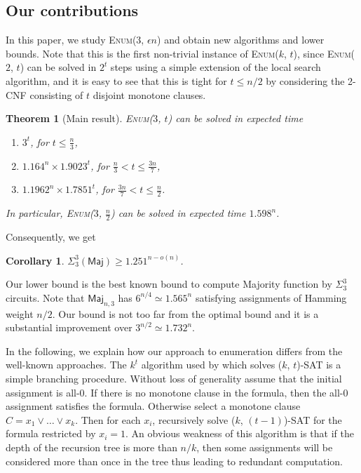 \documentclass[10pt,a4paper]{article}
\newtheorem{theorem}{Theorem}
\newtheorem{corollary}{Corollary}
\newcommand{\Maj}{\mathsf{Maj}}
\newcommand\enumballsat[2]{\textsc{Enum($#1$, $#2$)}}
\newcommand\ballsat[2]{\textsc{($#1$, $#2$)-SAT}}
\begin{document}
\subsection{Our contributions}

In this paper, we study \enumballsat{3}{\epsilon n} 
and obtain new algorithms and lower bounds. Note that this is the first non-trivial instance of \enumballsat{k}{t}, since \enumballsat{2}{t} can be solved in $2^t$ steps using a simple extension of the local search algorithm, and it is easy to see that this is tight for $t \le n/2$ by considering the 2-CNF consisting of $t$ disjoint monotone clauses.


\begin{theorem}[Main result]
\label{thm:main-result}
\enumballsat{3}{t} can be solved in expected time

\begin{enumerate}
	\item $3^t$, for $t \le \frac{n}{3}$,
	\item $1.164^n \times 1.9023^t$, for $\frac{n}{3} < t \le \frac{3n}{7}$,
	\item $1.1962^n \times 1.7851^t$, for $\frac{3n}{7} < t \le \frac{n}{2}$.
\end{enumerate}

In particular, \enumballsat{3}{\frac{n}{2}} can be solved in expected time $1.598^n$. 
\end{theorem}


Consequently, we get
\begin{corollary}
$\Sigma^3_3(\Maj) \ge 1.251^{n - o(n)}$.
\end{corollary}

Our lower bound is the best known bound
to compute Majority function by $\Sigma^3_3$ circuits.
Note that $\Maj_{n, 3}$ has $6^{n/4} \simeq 1.565^n$ satisfying assignments of Hamming weight $n/2$. Our bound is not too far from the optimal bound 
and it is a substantial improvement over $3^{n/2} \simeq 1.732^n$.

In the following, we explain how our approach to enumeration differs 
from the well-known approaches.
The $k^t$ algorithm used by \cite{DantsinGHKKPRS02} which 
solves \ballsat{k}{t} is a simple branching procedure. Without 
loss of generality assume that the initial assignment is all-0. If 
there is no monotone clause in the formula, 
then the all-0 assignment satisfies the formula. 
Otherwise select a monotone clause $C = x_1 \vee \ldots \vee x_k$. 
Then for each $x_i$, recursively solve \ballsat{k}{(t-1)} 
for the formula restricted by $x_i = 1$. 
An obvious weakness of this algorithm is that 
if the depth of the recursion tree is more than $n/k$, 
then some assignments will be considered more than once in 
the tree thus leading to redundant computation.
\end{document}
